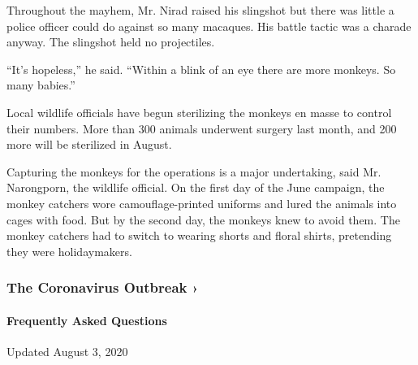 Throughout the mayhem, Mr. Nirad raised his slingshot but there was
little a police officer could do against so many macaques. His battle
tactic was a charade anyway. The slingshot held no projectiles.

``It's hopeless,'' he said. ``Within a blink of an eye there are more
monkeys. So many babies.''

Local wildlife officials have begun sterilizing the monkeys en masse to
control their numbers. More than 300 animals underwent surgery last
month, and 200 more will be sterilized in August.

Capturing the monkeys for the operations is a major undertaking, said
Mr. Narongporn, the wildlife official. On the first day of the June
campaign, the monkey catchers wore camouflage-printed uniforms and lured
the animals into cages with food. But by the second day, the monkeys
knew to avoid them. The monkey catchers had to switch to wearing shorts
and floral shirts, pretending they were holidaymakers.

\href{https://www.nytimes.com/news-event/coronavirus?action=click\&pgtype=Article\&state=default\&region=MAIN_CONTENT_3\&context=storylines_faq}{}

\hypertarget{the-coronavirus-outbreak-}{%
\subsubsection{The Coronavirus Outbreak
›}\label{the-coronavirus-outbreak-}}

\hypertarget{frequently-asked-questions}{%
\paragraph{Frequently Asked
Questions}\label{frequently-asked-questions}}

Updated August 3, 2020

